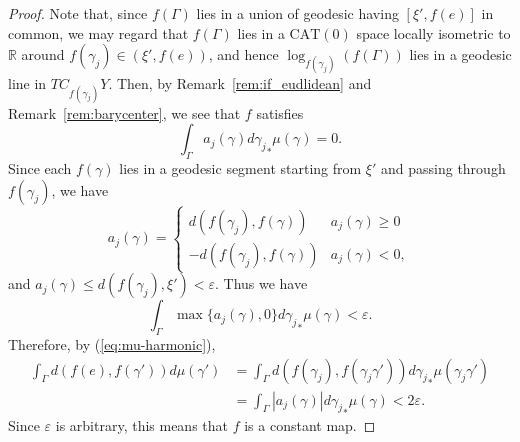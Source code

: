 \documentclass[12pt]{amsart}
\numberwithin{equation}{section}
\theoremstyle{plain}
\theoremstyle{definition}
\theoremstyle{remark}
\newcommand{\R}{{\mathbb R}}
\newcommand{\tcprj}{\log}
\newcommand{\cat}[1]{\mathrm{CAT}(#1)}
\begin{document}
\begin{proof}
Note that, since $f(\Gamma)$ lies in a union of geodesic 
having $[\xi',f(e)]$ in common, we may regard that $f(\Gamma)$
lies in a $\cat{0}$ space locally isometric to $\R$ around 
$f(\gamma_j) \in (\xi',f(e))$, and hence
$\tcprj_{f(\gamma_j)}(f(\Gamma))$ lies in a geodesic line in
$TC_{f(\gamma_j)}Y$. 
Then, by Remark~\ref{rem:if_eudlidean} and Remark~\ref{rem:barycenter}, 
we see that $f$ satisfies
\begin{equation}
\label{eq:mu-harmonic}
\int_{\Gamma}  a_j(\gamma) d{\gamma_j}_*\mu(\gamma) = 0. 
\end{equation} 
Since each $f(\gamma)$ lies in a geodesic segment starting from
$\xi'$ and passing through $f(\gamma_j)$, we have
\begin{equation*}
 a_j(\gamma) = 
\begin{cases}
 d(f(\gamma_j), f(\gamma)) & a_j(\gamma)\geq 0 \\
 -d(f(\gamma_j), f(\gamma)) & a_j(\gamma) < 0, 
\end{cases}
\end{equation*}
and $a_j(\gamma) \leq d(f(\gamma_j),\xi') < \varepsilon$.  
Thus we have
\begin{equation*}
 \int_{\Gamma} \max\{a_j(\gamma), 0 \} 
 d{\gamma_j}_*\mu (\gamma) <  \varepsilon. 
\end{equation*}
Therefore, by (\ref{eq:mu-harmonic}), 
\begin{equation*}
\begin{split}
  \int_{\Gamma} d(f(e),f(\gamma')) d\mu(\gamma')
 & = \int_{\Gamma} d(f(\gamma_j), f(\gamma_j \gamma')) 
 d{\gamma_j}_* \mu(\gamma_j \gamma') \\
 & = \int_{\Gamma} |a_j(\gamma)| d{\gamma_j}_* \mu(\gamma)
< 2\varepsilon. 
\end{split}
\end{equation*}
Since $\varepsilon$ is arbitrary, this means that $f$ is a constant
map. 


\end{proof}
\end{document}

